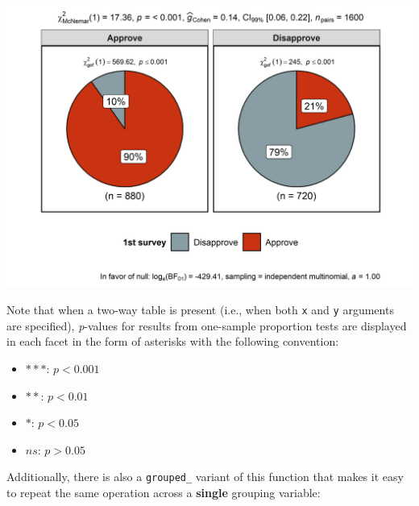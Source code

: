 \documentclass[
]{article}
\providecommand{\tightlist}{%
  \setlength{\itemsep}{0pt}\setlength{\parskip}{0pt}}
\begin{document}
\includegraphics[width=1\linewidth]{./figures/paper-ggpiestats3-1}

Note that when a two-way table is present (i.e., when both \texttt{x} and
\texttt{y} arguments are specified), \emph{p}-values for results from one-sample
proportion tests are displayed in each facet in the form of asterisks with the
following convention:

\begin{itemize}
\tightlist
\item
  \(***\): \(p < 0.001\)
\item
  \(**\): \(p < 0.01\)
\item
  \(*\): \(p < 0.05\)
\item
  \(ns\): \(p > 0.05\)
\end{itemize}

Additionally, there is also a \texttt{grouped\_} variant of this function that makes it
easy to repeat the same operation across a \textbf{single} grouping variable:
\end{document}
